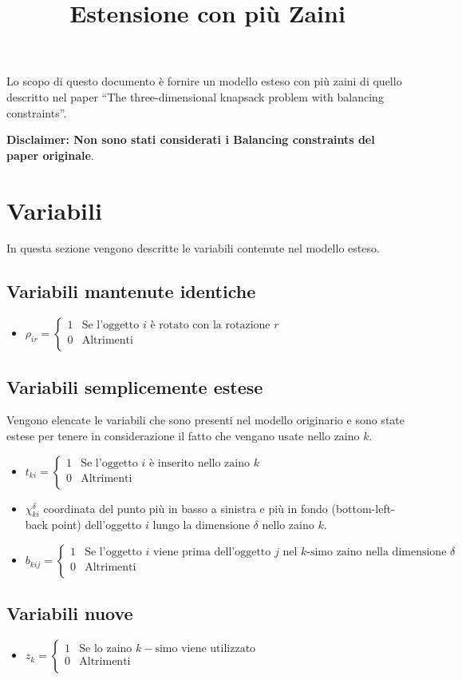 \documentclass{scrartcl}
\title{Estensione con più Zaini}
\newcommand{\MutliLineEquation}[3]{ 
	\ensuremath{
		#1 = \left\{
		\begin{array}{ll}
		1& \text{#2} \\
		0& \text{#3} \\
		\end{array}
		\right.
	}
}
\begin{document}
\maketitle
Lo scopo di questo documento è fornire un modello esteso con più zaini di quello descritto
nel paper ``The three-dimensional knapsack problem with balancing constraints''.

\textbf{Disclaimer: Non sono stati considerati i Balancing constraints del paper originale}.

	
\section{Variabili}
In questa sezione vengono descritte le variabili contenute nel modello esteso.
\subsection{Variabili mantenute identiche}
\begin{itemize}
	\item \MutliLineEquation{\rho_{ir}}{Se l'oggetto $i$ è rotato con la rotazione $r$}{Altrimenti}
\end{itemize}
\subsection{Variabili semplicemente estese}
Vengono elencate le variabili che sono presenti nel modello originario e sono state estese per tenere
in considerazione il fatto che vengano usate nello zaino $k$.
\begin{itemize}
	\item \MutliLineEquation{t_{ki}}{Se l'oggetto $i$ è inserito nello zaino $k$}{Altrimenti}
	\item $\chi_{ki}^\delta$ coordinata del punto più in basso a sinistra e più in fondo (bottom-left-back point) dell'oggetto
	$i$ lungo la dimensione $\delta$ nello zaino $k$.
	\item \MutliLineEquation{b_{kij}}{Se l'oggetto $i$ viene prima dell'oggetto $j$ nel $k$-simo zaino nella dimensione $\delta$}{Altrimenti}
\end{itemize}
\subsection{Variabili nuove}
\begin{itemize}
	\item \MutliLineEquation{z_k}{Se lo zaino $k-$simo viene utilizzato}{Altrimenti}
\end{itemize}
\end{document}
